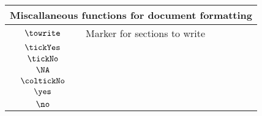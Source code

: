 \begin{longtable}{cl}
\multicolumn{2}{l}{Miscallaneous functions for document formatting}\\ 
 \hline
\hline
$\towrite$ &  Marker for sections to write\\ 
 $\tickYes$ & \\ 
 $\tickNo$ & \\ 
 $\NA$ & \\ 
 $\coltickNo$ & \\ 
 $\yes$ & \\ 
 $\no$ & \\ 
 \end{longtable}
